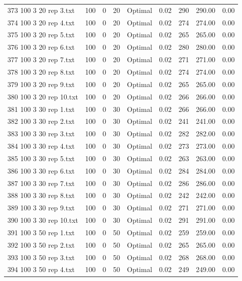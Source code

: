 \begin{longtable}{lrrllrrrr}
373 100 3 20 rep 3.txt & 100 & 0 & 20 & Optimal &  0.02 & 290 & 290.00 &  0.00\\
374 100 3 20 rep 4.txt & 100 & 0 & 20 & Optimal &  0.02 & 274 & 274.00 &  0.00\\
375 100 3 20 rep 5.txt & 100 & 0 & 20 & Optimal &  0.02 & 265 & 265.00 &  0.00\\
376 100 3 20 rep 6.txt & 100 & 0 & 20 & Optimal &  0.02 & 280 & 280.00 &  0.00\\
377 100 3 20 rep 7.txt & 100 & 0 & 20 & Optimal &  0.02 & 271 & 271.00 &  0.00\\
378 100 3 20 rep 8.txt & 100 & 0 & 20 & Optimal &  0.02 & 274 & 274.00 &  0.00\\
379 100 3 20 rep 9.txt & 100 & 0 & 20 & Optimal &  0.02 & 265 & 265.00 &  0.00\\
380 100 3 20 rep 10.txt & 100 & 0 & 20 & Optimal &  0.02 & 266 & 266.00 &  0.00\\
381 100 3 30 rep 1.txt & 100 & 0 & 30 & Optimal &  0.02 & 266 & 266.00 &  0.00\\
382 100 3 30 rep 2.txt & 100 & 0 & 30 & Optimal &  0.02 & 241 & 241.00 &  0.00\\
383 100 3 30 rep 3.txt & 100 & 0 & 30 & Optimal &  0.02 & 282 & 282.00 &  0.00\\
384 100 3 30 rep 4.txt & 100 & 0 & 30 & Optimal &  0.02 & 273 & 273.00 &  0.00\\
385 100 3 30 rep 5.txt & 100 & 0 & 30 & Optimal &  0.02 & 263 & 263.00 &  0.00\\
386 100 3 30 rep 6.txt & 100 & 0 & 30 & Optimal &  0.02 & 284 & 284.00 &  0.00\\
387 100 3 30 rep 7.txt & 100 & 0 & 30 & Optimal &  0.02 & 286 & 286.00 &  0.00\\
388 100 3 30 rep 8.txt & 100 & 0 & 30 & Optimal &  0.02 & 242 & 242.00 &  0.00\\
389 100 3 30 rep 9.txt & 100 & 0 & 30 & Optimal &  0.02 & 271 & 271.00 &  0.00\\
390 100 3 30 rep 10.txt & 100 & 0 & 30 & Optimal &  0.02 & 291 & 291.00 &  0.00\\
391 100 3 50 rep 1.txt & 100 & 0 & 50 & Optimal &  0.02 & 259 & 259.00 &  0.00\\
392 100 3 50 rep 2.txt & 100 & 0 & 50 & Optimal &  0.02 & 265 & 265.00 &  0.00\\
393 100 3 50 rep 3.txt & 100 & 0 & 50 & Optimal &  0.02 & 268 & 268.00 &  0.00\\
394 100 3 50 rep 4.txt & 100 & 0 & 50 & Optimal &  0.02 & 249 & 249.00 &  0.00\\

\end{longtable}
